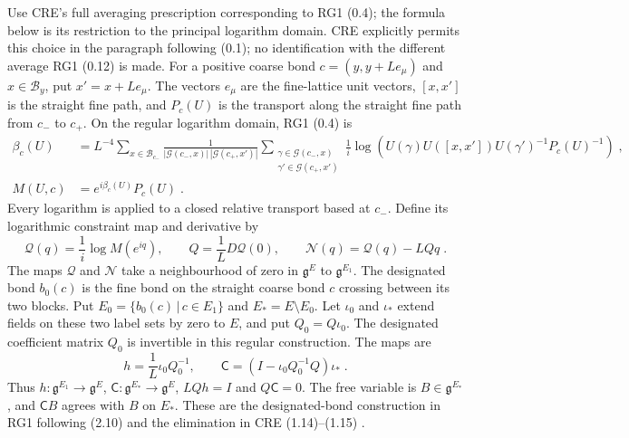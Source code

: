 \documentclass[11pt]{article}
\begin{document}
Use CRE's full averaging prescription corresponding to RG1 (0.4); the formula below is its restriction to the principal logarithm domain. CRE explicitly permits this choice in the paragraph following (0.1); no identification with the different average RG1 (0.12) is made. For a positive coarse bond $c=(y,y+Le_\mu)$ and $x\in\mathcal B_y$, put $x'=x+Le_\mu$. The vectors $e_\mu$ are the fine-lattice unit vectors, $[x,x']$ is the straight fine path, and $P_c(U)$ is the transport along the straight fine path from $c_-$ to $c_+$. On the regular logarithm domain, RG1 (0.4) is
\begin{equation}\label{eq:nonlinear-average}
    \begin{aligned}
        \beta_c(U)&=L^{-4}\sum_{x\in \mathcal B_{c_-}}
            \frac{1}{|\mathcal G(c_-,x)|\,|\mathcal G(c_+,x')|}
            \sum_{\substack{\gamma\in \mathcal G(c_-,x)\\
                \gamma'\in \mathcal G(c_+,x')}}
            \frac{1}{i}\log\left(
                U(\gamma)U([x,x'])U(\gamma')^{-1}P_c(U)^{-1}
                \right)\;,\\
        M(U,c)&=e^{i\beta_c(U)}P_c(U)\;.
    \end{aligned}
\end{equation}
Every logarithm is applied to a closed relative transport based at $c_-$. Define its logarithmic constraint map and derivative by
\begin{equation}\label{eq:constraint-primitive}
    \mathcal Q(q)=\frac{1}{i}\log M(e^{iq}),
    \qquad Q=\frac{1}{L}D\mathcal Q(0),
    \qquad \mathcal N(q)=\mathcal Q(q)-LQq\;.
\end{equation}
The maps $\mathcal Q$ and $\mathcal N$ take a neighbourhood of zero in $\mathfrak g^E$ to $\mathfrak g^{E_1}$. The designated bond $b_0(c)$ is the fine bond on the straight coarse bond $c$ crossing between its two blocks. Put $E_0=\{b_0(c)\, | \,c\in E_1\}$ and $E_*=E\setminus E_0$. Let $\iota_0$ and $\iota_*$ extend fields on these two label sets by zero to $E$, and put $Q_0=Q\iota_0$. The designated coefficient matrix $Q_0$ is invertible in this regular construction. The maps are
\begin{equation}\label{eq:constraint-extension}
    h=\frac{1}{L}\iota_0Q_0^{-1},
    \qquad
    \mathsf C=(I-\iota_0Q_0^{-1}Q)\iota_*\;.
\end{equation}
Thus $h \colon \mathfrak g^{E_1}\to\mathfrak g^E$, $\mathsf C \colon \mathfrak g^{E_*}\to\mathfrak g^E$, $LQh=I$ and $Q\mathsf C=0$. The free variable is $B\in\mathfrak g^{E_*}$, and $\mathsf C B$ agrees with $B$ on $E_*$. These are the designated-bond construction in RG1 following (2.10) and the elimination in CRE (1.14)--(1.15) \cite{BalabanCRE,BalabanRG1}.
\end{document}
